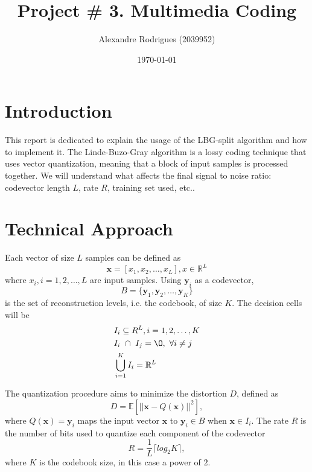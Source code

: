 \documentclass[a4paper, 11pt]{article}
\begin{document}
	
	\title{Project \# 3. Multimedia Coding }
	\author{{\small Alexandre Rodrigues (2039952)}}
	\date{\today}
	\maketitle
	
	\section{Introduction}
		This report is dedicated to explain the usage of the LBG-split algorithm and how to implement it.
		The Linde-Buzo-Gray algorithm is a lossy coding technique that uses vector quantization, meaning that a block of input samples is processed together.
		We will understand what affects the final signal to noise ratio: codevector length $ L $, rate $ R $, training set used, etc..
	
	\section{Technical Approach}
		Each vector of size $ L $ samples can be defined as
		\begin{equation}
			\mathbf{x} = [x_1, x_2, \ldots, x_L], x \in \mathbb{R}^L
		\end{equation}
		where $x_i, i=1,2,\ldots,L$ are input samples. 
		Using $\mathbf{y}_i $ as a codevector, 
		\begin{equation}
			B =  \{\mathbf{y}_1, \mathbf{y}_2, \ldots, \mathbf{y}_K\}
		\end{equation} 
		is the set of reconstruction levels, i.e. the codebook, of size $ K $.
		The decision cells will be
		\begin{align}
			& I_i \subseteq R^L, i = 1, 2, \ldots, K \\
			& I_i\ \cap \ I_j = \O ,\ \forall i \neq j \\
			& \bigcup^K_{i=1} I_i = \mathbb{R}^L
		\end{align} 
		
		The quantization procedure aims to minimize the distortion $ D $, defined as 
		\begin{equation}
			D = \mathbb{E} [||\mathbf{x}-Q(\mathbf{x})||^2],
		\end{equation} 
		where $ Q(\mathbf{x}) = \mathbf{y}_i $ maps the input vector $ \mathbf{x} $ to $\mathbf{y}_i \in B$ when $\mathbf{x} \in I_i $.
		The rate $R$ is the number of bits used to quantize each component of the codevector
		\begin{equation}
			R = \frac{1}{L}\lceil log_2K\rceil,
			\label{eq:rate}
		\end{equation} 
		where $ K $ is the codebook size, in this case a power of $ 2 $.
		
\end{document}
